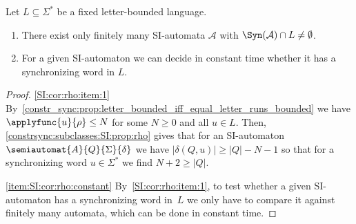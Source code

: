 \begin{corollary}\label{constrsync:subclasses:SI:cor:rho}
	Let $L \subseteq \Sigma^*$ be a fixed letter-bounded language.
	
	\begin{enumerate}
	\item \label{SI:cor:rho:item:1} There exist only finitely many SI-automata $\mathcal A$
	with $\Syn(\mathcal A) \cap L \ne \emptyset$.%
	
	\item \label{item:SI:cor:rho:constant} For a given SI-automaton we can decide in constant time
	whether it has a synchronizing word in $L$.
	\end{enumerate}	
\end{corollary}
\begin{proof}
\ref{SI:cor:rho:item:1} By~\cref{constr_sync:prop:letter_bounded_iff_equal_letter_runs_bounded}
we have $\applyfunc{u}{\rho} \le N$ for some $N \ge 0$
and all $u \in L$.
Then, \cref{constrsync:subclasses:SI:prop:rho}
gives that for an SI-automaton $\semiautomat{A}{Q}{\Sigma}{\delta}$
we have $|\delta(Q, u)| \ge |Q| - N - 1$
so that for a synchronizing word $u \in \Sigma^*$
we find $N + 2 \ge |Q|$.

\ref{item:SI:cor:rho:constant} By~\ref{SI:cor:rho:item:1}, to test whether a given SI-automaton
has a synchronizing word in~$L$
we only have to compare it against finitely many automata, which can be done
in constant time.		
\end{proof}

